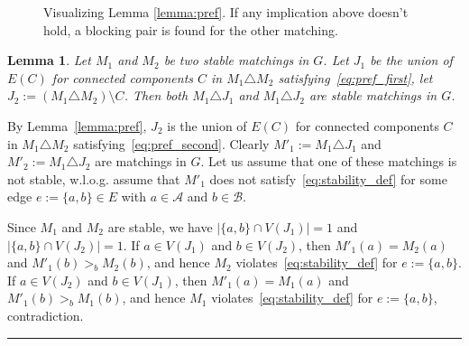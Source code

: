 \documentclass[preprint]{elsarticle}
\newtheorem{lemma}[fact]{Lemma}
\newenvironment{proof}{{\bf Proof:  }}{\hfill\rule{2mm}{2mm}}
\begin{document}
\begin{figure}[H]
\centering
{}
\caption{Visualizing Lemma \ref{lemma:pref}. If any implication above doesn't hold, a blocking pair is found for the other matching.}
\end{figure}

\begin{lemma}\label{lemma:sym_stable} 
Let $M_1$ and $M_2$ be two stable matchings in $G$. Let $J_1$ be the union of $E(C)$ for connected components $C$ in $M_1 \triangle M_2$ satisfying~\eqref{eq:pref_first}, let $J_2:=(M_1\triangle M_2)\setminus C$. Then both $M_1\triangle J_1$ and $M_1\triangle J_2$ are stable matchings in $G$.
\end{lemma}
\begin{proof}
By Lemma~\ref{lemma:pref}, $J_2$ is the union of $E(C)$ for connected components $C$ in $M_1 \triangle M_2$ satisfying~\eqref{eq:pref_second}. Clearly $M'_1:=M_1\triangle J_1$ and $M'_2:=M_1\triangle J_2$ are matchings in $G$. Let us assume that one of these matchings is not stable, w.l.o.g. assume that $M'_1$ does not satisfy~\eqref{eq:stability_def} for some edge $e:=\{a,b\}\in E$ with $a\in\mathcal{A}$ and $b\in\mathcal{B}$. 

Since $M_1$ and $M_2$ are stable, we have $|\{a,b\}\cap V(J_1)|=1$ and $|\{a,b\}\cap V(J_2)|=1$.
If $a\in V(J_1)$ and $b\in V(J_2)$, then $M'_1(a)=M_2(a)$ and $M'_1(b)>_b M_2(b)$, and hence $M_2$ violates~\eqref{eq:stability_def} for $e:=\{a,b\}$. If $a\in V(J_2)$ and $b\in V(J_1)$, then $M'_1(a)=M_1(a)$ and $M'_1(b)>_b M_1(b)$, and hence $M_1$ violates~\eqref{eq:stability_def} for $e:=\{a,b\}$, contradiction.
\end{proof}
\end{document}
